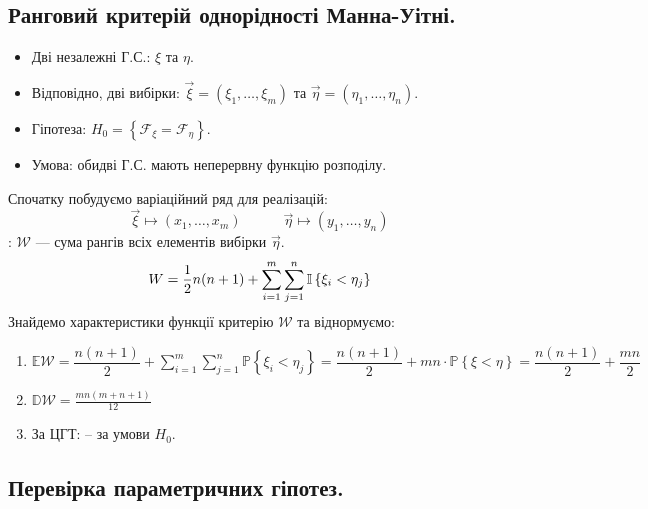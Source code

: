 \subsection{Ранговий критерій однорідності Манна-Уітні.}
\begin{itemize}
  \item Дві незалежні Г.С.: \( \xi \) та \( \eta \). \item
  Відповідно, дві вибірки: \( \overrightarrow{\xi} = (\xi_1, \dots, \xi_m) \) та \( \overrightarrow{\eta} = (\eta_1 , \dots , \eta_n) \).\item
  Гіпотеза: \( H_0 = \left\lbrace \mathcal{F}_{\xi} = \mathcal{F}_{\eta} \right\rbrace \).\item
  Умова: обидві Г.С. мають неперервну функцію розподілу.
\end{itemize}
Спочатку побудуємо  варіаційний ряд для реалізацій:
\[
  \overrightarrow{\xi} \mapsto (x_1 , \dots, x_m) \qquad \quad \overrightarrow{\eta} \mapsto (y_1 , \dots, y_n)
\]
: \( \mathcal{W} \) --- сума рангів всіх елементів вибірки \( \overrightarrow{\eta} \).
\[
 W = \frac{1}{2} n (n+1) +  \sum\limits_{i=1}^{m}{
  \sum\limits_{j=1}^{n}{\mathbb{I} \left\lbrace \xi_i < \eta_j \right\rbrace}
 }
\]
\def\mcW{\mathcal{W}}
Знайдемо характеристики функції критерію \( \mathcal{W} \) та віднормуємо:
\begin{enumerate}
  \item \( \mathbb{E} \mcW = \dfrac{n(n+1)}{2} + \sum\limits_{i=1}^{m}{
   \sum\limits_{j=1}^{n}{ \mathbb{P} \left\lbrace \xi_i < \eta_j \right\rbrace}
  } = \dfrac{n(n+1)}{2} + mn\cdot \mathbb{P} \left\lbrace \xi < \eta \right\rbrace = \dfrac{n(n+1)}{2} + \dfrac{mn}{2} \)
  \item \(
    \displaystyle
    \mathbb{D} \mcW = \frac{mn(m+n+1)}{12}
   \)
   \item За ЦГТ:  -- за умови $H_0$.
\end{enumerate}
\newpage
\subsection{Перевірка параметричних гіпотез.}
